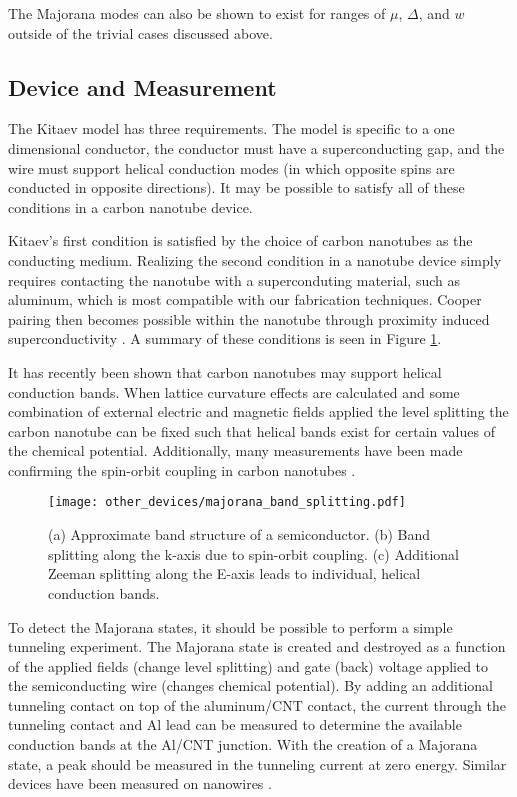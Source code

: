 The Majorana modes can also be shown to exist for ranges of $\mu$, $\Delta$, and $w$ outside of the trivial cases discussed above.  

\subsection{Device and Measurement}

The Kitaev model has three requirements.  The model is specific to a one dimensional conductor, the conductor must have a superconducting gap, and the wire must support helical conduction modes (in which opposite spins are conducted in opposite directions).  It may be possible to satisfy all of these conditions in a carbon nanotube device.

Kitaev's first condition is satisfied by the choice of carbon nanotubes as the conducting medium.  Realizing the second condition in a nanotube device simply requires contacting the nanotube with a superconduting material, such as aluminum, which is most compatible with our fabrication techniques.  Cooper pairing then becomes possible within the nanotube through proximity induced superconductivity \cite{Kasumov1999, JarilloHerrero2006}. A summary of these conditions is seen in Figure \ref{fig:band_splitting}. 

It has recently been shown that carbon nanotubes may support helical conduction bands\cite{Klinovaja2011a, Klinovaja2011}.  When lattice curvature effects are calculated and some combination of external electric and magnetic fields applied the level splitting the carbon nanotube can be fixed such that helical bands exist for certain values of the chemical potential. Additionally, many measurements have been made confirming the spin-orbit coupling in carbon nanotubes \cite{Kuemmeth2008, Jespersen2011, Steele2013 ,Lai2014}.

\begin{figure}
    \centering
    \texttt{[image: other\_devices/majorana\_band\_splitting.pdf]}
    \caption{(a) Approximate band structure of a semiconductor. (b) Band splitting along the k-axis due to spin-orbit coupling. (c) Additional Zeeman splitting along the E-axis leads to individual, helical conduction bands.}
    \label{fig:band_splitting}
\end{figure}

To detect the Majorana states, it should be possible to perform a simple tunneling experiment. The Majorana state is created and destroyed as a function of the applied fields (change level splitting) and gate (back) voltage applied to the semiconducting wire (changes chemical potential). By adding an additional tunneling contact on top of the aluminum/CNT contact, the current through the tunneling contact and Al lead can be measured to determine the available conduction bands at the Al/CNT junction. With the creation of a Majorana state, a peak should be measured in the tunneling current at zero energy. Similar devices have been measured on  nanowires \cite{Mourik2012}. 

